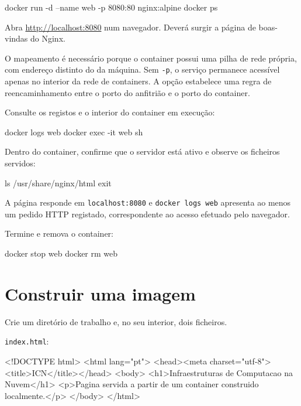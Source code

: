 \documentclass[11pt,a4paper]{article}
\begin{document}
\begin{terminal}
docker run -d --name web -p 8080:80 nginx:alpine
docker ps
\end{terminal}

Abra \url{http://localhost:8080} num navegador. Deverá surgir a página de boas-vindas do Nginx.

O mapeamento é necessário porque o container possui uma pilha de rede própria, com endereço distinto do da máquina. Sem \texttt{-p}, o serviço permanece acessível apenas no interior da rede de containers. A opção estabelece uma regra de reencaminhamento entre o porto do anfitrião e o porto do container.

Consulte os registos e o interior do container em execução:

\begin{terminal}
docker logs web
docker exec -it web sh
\end{terminal}

Dentro do container, confirme que o servidor está ativo e observe os ficheiros servidos:

\begin{terminal}
ls /usr/share/nginx/html
exit
\end{terminal}

\begin{verificar}
A página responde em \texttt{localhost:8080} e \texttt{docker logs web} apresenta ao menos um pedido HTTP registado, correspondente ao acesso efetuado pelo navegador.
\end{verificar}

Termine e remova o container:

\begin{terminal}
docker stop web
docker rm web
\end{terminal}

\section{Construir uma imagem}

Crie um diretório de trabalho e, no seu interior, dois ficheiros.

\texttt{index.html}:

\begin{terminal}
<!DOCTYPE html>
<html lang="pt">
<head><meta charset="utf-8"><title>ICN</title></head>
<body>
  <h1>Infraestruturas de Computacao na Nuvem</h1>
  <p>Pagina servida a partir de um container construido localmente.</p>
</body>
</html>
\end{terminal}
\end{document}
